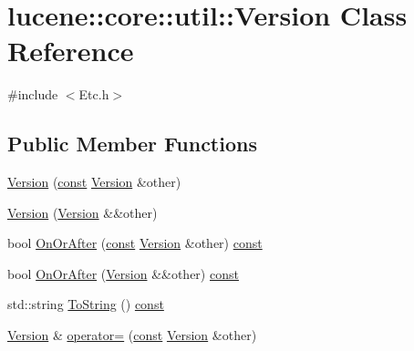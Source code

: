 \hypertarget{classlucene_1_1core_1_1util_1_1Version}{}\section{lucene\+:\+:core\+:\+:util\+:\+:Version Class Reference}
\label{classlucene_1_1core_1_1util_1_1Version}


{\ttfamily \#include $<$Etc.\+h$>$}

\subsection*{Public Member Functions}
\begin{DoxyCompactItemize}
\item 
\mbox{\hyperlink{classlucene_1_1core_1_1util_1_1Version_a88c40db992f59dc30c5214a825471d34}{Version}} (\mbox{\hyperlink{ZlibCrc32_8h_a2c212835823e3c54a8ab6d95c652660e}{const}} \mbox{\hyperlink{classlucene_1_1core_1_1util_1_1Version}{Version}} \&other)
\item 
\mbox{\hyperlink{classlucene_1_1core_1_1util_1_1Version_a687236c7b78a120c2973e2869f37663c}{Version}} (\mbox{\hyperlink{classlucene_1_1core_1_1util_1_1Version}{Version}} \&\&other)
\item 
bool \mbox{\hyperlink{classlucene_1_1core_1_1util_1_1Version_afa22f8550048b79ea1f64614cac56a61}{On\+Or\+After}} (\mbox{\hyperlink{ZlibCrc32_8h_a2c212835823e3c54a8ab6d95c652660e}{const}} \mbox{\hyperlink{classlucene_1_1core_1_1util_1_1Version}{Version}} \&other) \mbox{\hyperlink{ZlibCrc32_8h_a2c212835823e3c54a8ab6d95c652660e}{const}}
\item 
bool \mbox{\hyperlink{classlucene_1_1core_1_1util_1_1Version_a651349226b4946c5dee868f60e090ff5}{On\+Or\+After}} (\mbox{\hyperlink{classlucene_1_1core_1_1util_1_1Version}{Version}} \&\&other) \mbox{\hyperlink{ZlibCrc32_8h_a2c212835823e3c54a8ab6d95c652660e}{const}}
\item 
std\+::string \mbox{\hyperlink{classlucene_1_1core_1_1util_1_1Version_a2c27700eb00fbfaa157f3615b8f025ba}{To\+String}} () \mbox{\hyperlink{ZlibCrc32_8h_a2c212835823e3c54a8ab6d95c652660e}{const}}
\item 
\mbox{\hyperlink{classlucene_1_1core_1_1util_1_1Version}{Version}} \& \mbox{\hyperlink{classlucene_1_1core_1_1util_1_1Version_acadb681698bff09f325e17475cdb10d3}{operator=}} (\mbox{\hyperlink{ZlibCrc32_8h_a2c212835823e3c54a8ab6d95c652660e}{const}} \mbox{\hyperlink{classlucene_1_1core_1_1util_1_1Version}{Version}} \&other)

\end{DoxyCompactItemize}
